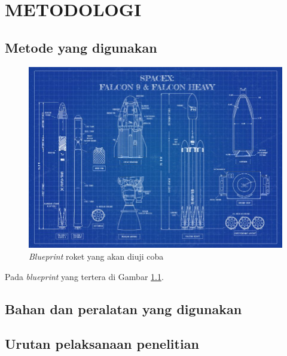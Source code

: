 \chapter{METODOLOGI}


\section{Metode yang digunakan}

\lipsum[11]

\begin{figure} [H] \centering
  \includegraphics[scale=0.45]{gambar/blueprint.jpg}
  \caption{\emph{Blueprint} roket yang akan diuji coba}
  \label{fig:Blueprint}
\end{figure}

Pada \emph{blueprint} yang tertera di Gambar \ref{fig:Blueprint}. \lipsum[12]

\section{Bahan dan peralatan yang digunakan}

\lipsum[13]
\lipsum[3]

\section{Urutan pelaksanaan penelitian}

